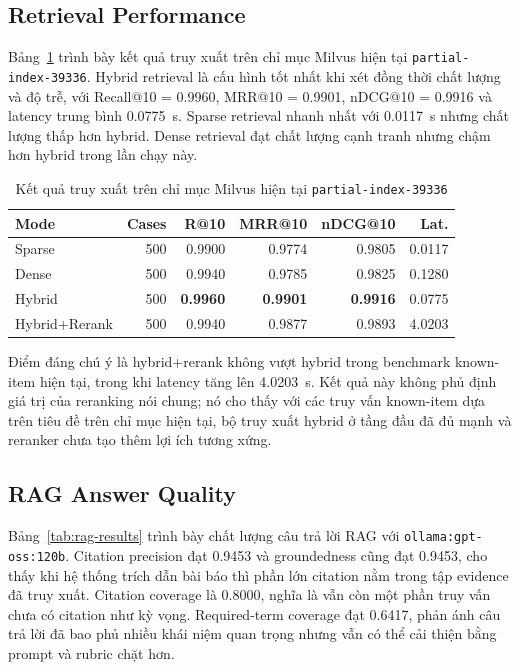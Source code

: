 \documentclass[conference]{IEEEtran}
\newcommand{\partialindex}{\texttt{partial-index-39336}}
\begin{document}
\subsection{Retrieval Performance}

Bảng~\ref{tab:retrieval-results} trình bày kết quả truy xuất trên chỉ mục Milvus hiện tại \partialindex. Hybrid retrieval là cấu hình tốt nhất khi xét đồng thời chất lượng và độ trễ, với Recall@10 = 0.9960, MRR@10 = 0.9901, nDCG@10 = 0.9916 và latency trung bình 0.0775~s. Sparse retrieval nhanh nhất với 0.0117~s nhưng chất lượng thấp hơn hybrid. Dense retrieval đạt chất lượng cạnh tranh nhưng chậm hơn hybrid trong lần chạy này.

\begin{table}[t]
\caption{Kết quả truy xuất trên chỉ mục Milvus hiện tại \partialindex}
\label{tab:retrieval-results}
\centering
\setlength{\tabcolsep}{4pt}
\begin{tabular}{lrrrrr}
\toprule
\textbf{Mode} & \textbf{Cases} & \textbf{R@10} & \textbf{MRR@10} & \textbf{nDCG@10} & \textbf{Lat.}\\
\midrule
Sparse & 500 & 0.9900 & 0.9774 & 0.9805 & 0.0117\\
Dense & 500 & 0.9940 & 0.9785 & 0.9825 & 0.1280\\
Hybrid & 500 & \textbf{0.9960} & \textbf{0.9901} & \textbf{0.9916} & 0.0775\\
Hybrid+Rerank & 500 & 0.9940 & 0.9877 & 0.9893 & 4.0203\\
\bottomrule
\end{tabular}
\end{table}

Điểm đáng chú ý là hybrid+rerank không vượt hybrid trong benchmark known-item hiện tại, trong khi latency tăng lên 4.0203~s. Kết quả này không phủ định giá trị của reranking nói chung; nó cho thấy với các truy vấn known-item dựa trên tiêu đề trên chỉ mục hiện tại, bộ truy xuất hybrid ở tầng đầu đã đủ mạnh và reranker chưa tạo thêm lợi ích tương xứng.

\subsection{RAG Answer Quality}

Bảng~\ref{tab:rag-results} trình bày chất lượng câu trả lời RAG với \texttt{ollama:gpt-oss:120b}. Citation precision đạt 0.9453 và groundedness cũng đạt 0.9453, cho thấy khi hệ thống trích dẫn bài báo thì phần lớn citation nằm trong tập evidence đã truy xuất. Citation coverage là 0.8000, nghĩa là vẫn còn một phần truy vấn chưa có citation như kỳ vọng. Required-term coverage đạt 0.6417, phản ánh câu trả lời đã bao phủ nhiều khái niệm quan trọng nhưng vẫn có thể cải thiện bằng prompt và rubric chặt hơn.
\end{document}
